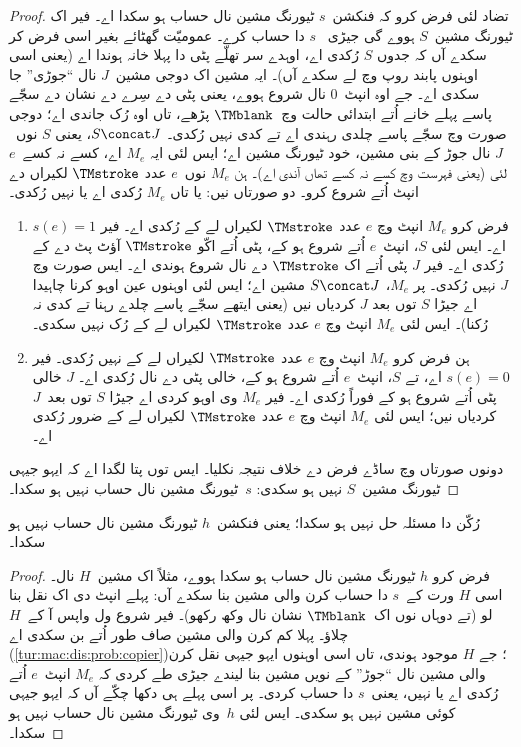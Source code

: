 \documentclass[../../../include/open-logic-section]{subfiles}
\begin{document}
\begin{proof}
تضاد لئی فرض کرو کہ فنکشن~$s$ ٹیورنگ مشین نال حساب
ہو سکدا اے۔ فیر اک ٹیورنگ مشین~$S$ ہووے گی جیڑی
~$s$ دا حساب کرے۔ عمومیّت گھٹائے بغیر اسی فرض کر
سکدے آں کہ جدوں $S$ رُکدی اے، اوہدے سر تھلّے
پٹی دا پہلا خانہ ہوندا اے (یعنی اسی اوہنوں پابند روپ وچ
لے سکدے آں)۔ ایہ مشین اک دوجی مشین~$J$ نال
“جوڑی” جا سکدی اے۔ جے اوہ انپٹ~$0$ نال شروع
ہووے، یعنی پٹی دے سِرے دے نشان دے سجّے پاسے
پہلے خانے اُتے ابتدائی حالت وچ~$\TMblank$ پڑھے،
تاں اوہ رُک جاندی اے؛ دوجی صورت وچ سجّے پاسے
چلدی رہندی اے تے کدی نہیں رُکدی۔ $S \concat J$،
یعنی $S$ نوں~$J$ نال جوڑ کے بنی مشین، خود ٹیورنگ
مشین اے؛ ایس لئی ایہ $M_e$ اے، کسے نہ کسے~$e$ لئی
(یعنی فہرست وچ کسے نہ کسے تھاں آندی اے)۔ ہن $M_e$
نوں~$e$ عدد $\TMstroke$ لکیراں دے انپٹ اُتے
شروع کرو۔ دو صورتاں نیں: یا تاں $M_e$ رُکدی اے
یا نہیں رُکدی۔
\begin{enumerate}
\item فرض کرو $M_e$ انپٹ وچ $e$ عدد $\TMstroke$
  لکیراں لے کے رُکدی اے۔ فیر $s(e)
  = 1$ اے۔ ایس لئی $S$، انپٹ~$e$ اُتے شروع
  ہو کے، پٹی اُتے اکّو $\TMstroke$ آؤٹ پٹ دے
  کے رُکدی اے۔ فیر $J$ پٹی اُتے اک $\TMstroke$
  دے نال شروع ہوندی اے۔ ایس صورت وچ $J$ نہیں
  رُکدی۔ پر $M_e$، $S
  \concat J$ مشین اے؛ ایس لئی اوہنوں عین اوہو
  کرنا چاہیدا اے جیڑا $S$ توں بعد $J$ کردیاں نیں
  (یعنی ایتھے سجّے پاسے چلدے رہنا تے کدی نہ رُکنا)۔
  ایس لئی $M_e$ انپٹ وچ $e$ عدد $\TMstroke$
  لکیراں لے کے رُک نہیں سکدی۔

\item ہن فرض کرو $M_e$ انپٹ وچ $e$ عدد
  $\TMstroke$ لکیراں لے کے نہیں رُکدی۔ فیر
  $s(e) = 0$ اے، تے $S$، انپٹ~$e$ اُتے
  شروع ہو کے، خالی پٹی دے نال رُکدی اے۔ $J$
  خالی پٹی اُتے شروع ہو کے فوراً رُکدی اے۔ فیر
  $M_e$ وی اوہو کردی اے جیڑا $S$ توں بعد~$J$
  کردیاں نیں؛ ایس لئی $M_e$ انپٹ وچ $e$ عدد
  $\TMstroke$ لکیراں لے کے ضرور رُکدی اے۔
\end{enumerate}
دونوں صورتاں وچ ساڈے فرض دے خلاف نتیجہ نکلیا۔
ایس توں پتا لگدا اے کہ ایہو جیہی ٹیورنگ مشین~$S$
نہیں ہو سکدی: $s$~ٹیورنگ مشین نال حساب نہیں ہو سکدا۔
\end{proof}

\begin{thm}
 رُکّن دا مسئلہ حل نہیں ہو
سکدا؛ یعنی فنکشن~$h$ ٹیورنگ مشین نال حساب نہیں
ہو سکدا۔
\end{thm}

\begin{proof}
فرض کرو $h$ ٹیورنگ مشین نال حساب ہو سکدا ہووے،
مثلاً اک مشین~$H$ نال۔ اسی $H$ ورت کے~$s$ دا
حساب کرن والی مشین بنا سکدے آں: پہلے انپٹ دی
اک نقل بنا لو (تے دوہاں نوں اک~$\TMblank$ نشان
نال وکھ رکھو)۔ فیر شروع ول واپس آ کے~$H$ چلاؤ۔
پہلا کم کرن والی مشین صاف طور اُتے بن سکدی اے
(\cref{tur:mac:dis:prob:copier})؛ جے $H$ موجود
ہوندی، تاں اسی اوہنوں ایہو جیہی نقل کرن والی مشین نال
“جوڑ” کے نویں مشین بنا لیندے جیڑی طے کردی کہ
$M_e$ انپٹ~$e$ اُتے رُکدی اے یا نہیں، یعنی~$s$
دا حساب کردی۔ پر اسی پہلے ہی دکھا چکّے آں کہ
ایہو جیہی کوئی مشین نہیں ہو سکدی۔ ایس لئی $h$~وی
ٹیورنگ مشین نال حساب نہیں ہو سکدا۔
\end{proof}
\end{document}
